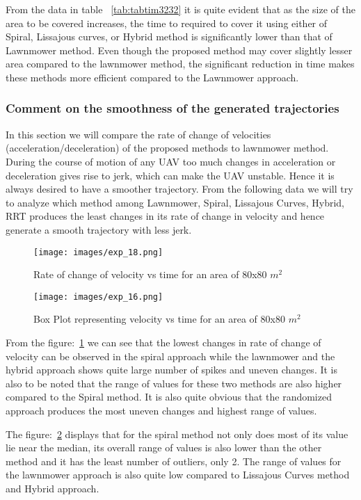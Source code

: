 From the data in table ~\ref{tab:tabtim3232} it is quite evident that as the size of the area to be covered increases, the time to required to cover it using either of Spiral, Lissajous curves, or Hybrid method is significantly lower than that of Lawnmower method. Even though the proposed method may cover slightly lesser area compared to the lawnmower method, the significant reduction in time makes these methods more efficient compared to the Lawnmower approach.

\subsubsection{Comment on the smoothness of the generated trajectories}
\label{subsubsec:smoothy3}
In this section we will compare the rate of change of velocities (acceleration/deceleration) of the proposed methods to lawnmower method. During the course of motion of any UAV too much changes in acceleration or deceleration gives rise to jerk, which can make the UAV unstable. Hence it is always desired to have a smoother trajectory. From the following data we will try to analyze which method among Lawnmower, Spiral, Lissajous Curves, Hybrid, RRT produces the least changes in its rate of change in velocity and hence generate a smooth trajectory with less jerk.

\begin{figure}[htbp]
  \texttt{[image: images/exp\_18.png]}
  \caption{Rate of change of velocity vs time for an area of 80x80 $m^{2}$ }\label{fig:expacc3}
\end{figure}

\begin{figure}[htbp]
  \texttt{[image: images/exp\_16.png]}
  \caption{Box Plot representing velocity vs time for an area of 80x80 $m^{2}$ }\label{fig:expacc4}
\end{figure}

\pagebreak
From the figure:~\ref{fig:expacc3} we can see that the lowest changes in rate of change of velocity can be observed in the spiral approach while the lawnmower and the hybrid approach shows quite large number of spikes and uneven changes. It is also to be noted that the range of values for these two methods are also higher compared to the Spiral method. It is also quite obvious that the randomized approach produces the most uneven changes and highest range of values.

The figure:~\ref{fig:expacc4} displays that for the spiral method not only does most of its value lie near the median, its overall range of values is also lower than the other method and it has the least number of outliers, only 2. The range of values for the lawnmower approach is also quite low compared to Lissajous Curves method and Hybrid approach.
\newpage
